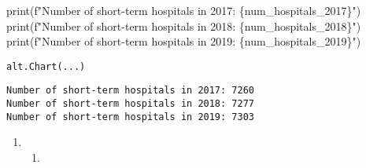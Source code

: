 \documentclass[
  letterpaper,
  DIV=11,
  numbers=noendperiod]{scrartcl}
\newenvironment{Shaded}{\begin{snugshade}}{\end{snugshade}}
\newcommand{\BuiltInTok}[1]{\textcolor[rgb]{0.00,0.23,0.31}{#1}}
\newcommand{\NormalTok}[1]{\textcolor[rgb]{0.00,0.23,0.31}{#1}}
\newcommand{\SpecialCharTok}[1]{\textcolor[rgb]{0.37,0.37,0.37}{#1}}
\newcommand{\SpecialStringTok}[1]{\textcolor[rgb]{0.13,0.47,0.30}{#1}}
\providecommand{\tightlist}{%
  \setlength{\itemsep}{0pt}\setlength{\parskip}{0pt}}\usepackage{longtable,booktabs,array}
\begin{document}
\begin{Shaded}
\begin{Highlighting}[]
\BuiltInTok{print}\NormalTok{(}\SpecialStringTok{f"Number of short{-}term hospitals in 2017: }\SpecialCharTok{\{}\NormalTok{num\_hospitals\_2017}\SpecialCharTok{\}}\SpecialStringTok{"}\NormalTok{)}
\BuiltInTok{print}\NormalTok{(}\SpecialStringTok{f"Number of short{-}term hospitals in 2018: }\SpecialCharTok{\{}\NormalTok{num\_hospitals\_2018}\SpecialCharTok{\}}\SpecialStringTok{"}\NormalTok{)}
\BuiltInTok{print}\NormalTok{(}\SpecialStringTok{f"Number of short{-}term hospitals in 2019: }\SpecialCharTok{\{}\NormalTok{num\_hospitals\_2019}\SpecialCharTok{\}}\SpecialStringTok{"}\NormalTok{)}
\end{Highlighting}
\end{Shaded}

\begin{verbatim}
alt.Chart(...)
\end{verbatim}

\begin{verbatim}
Number of short-term hospitals in 2017: 7260
Number of short-term hospitals in 2018: 7277
Number of short-term hospitals in 2019: 7303
\end{verbatim}

\begin{enumerate}
\def\labelenumi{\arabic{enumi}.}
\setcounter{enumi}{3}
\tightlist
\item
  \begin{enumerate}
  \def\labelenumii{\alph{enumii}.}
  \tightlist
  \item
  \end{enumerate}
\end{enumerate}
\end{document}

